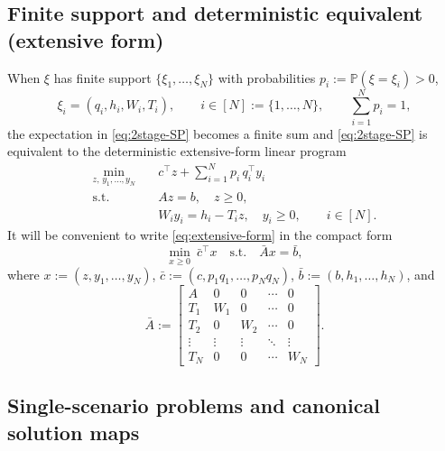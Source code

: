 \documentclass[11pt]{article}
\theoremstyle{plain}
\theoremstyle{definition}
\theoremstyle{remark}
\begin{document}
\subsection{Finite support and deterministic equivalent (extensive form)}\label{subsec:extensive}

When $\xi$ has finite support $\{\xi_1,\dots,\xi_N\}$ with probabilities $p_i:=\mathbb P(\xi=\xi_i)>0$,
\[
\xi_i=(q_i,h_i,W_i,T_i), \qquad i\in[N]:=\{1,\dots,N\}, \qquad \sum_{i=1}^N p_i=1,
\]
the expectation in \eqref{eq:2stage-SP} becomes a finite sum and \eqref{eq:2stage-SP} is equivalent to the
deterministic extensive-form linear program
\begin{equation}\label{eq:extensive-form}
\begin{aligned}
  \min_{z,\,y_1,\dots,y_N}\quad & c^\top z + \sum_{i=1}^N p_i\, q_i^\top y_i \\
  \text{s.t.}\quad & Az=b,\quad z\ge 0,\\
  & W_i y_i = h_i - T_i z,\quad y_i\ge 0,\qquad i\in[N].
\end{aligned}
\end{equation}
It will be convenient to write \eqref{eq:extensive-form} in the compact form
\begin{equation}\label{eq:extensive-compact}
  \min_{x\ge 0}\ \bar c^\top x \quad\text{s.t.}\quad \bar A x = \bar b,
\end{equation}
where $x:=(z,y_1,\dots,y_N)$, $\bar c:=(c,p_1q_1,\dots,p_N q_N)$, $\bar b:=(b,h_1,\dots,h_N)$, and
\begin{equation}\label{eq:Abar}
  \bar A :=
  \begin{bmatrix}
    A & 0 & 0 & \cdots & 0 \\
    T_1 & W_1 & 0 & \cdots & 0 \\
    T_2 & 0 & W_2 & \cdots & 0 \\
    \vdots & \vdots & \vdots & \ddots & \vdots \\
    T_N & 0 & 0 & \cdots & W_N
  \end{bmatrix}.
\end{equation}

\subsection{Single-scenario problems and canonical solution maps}\label{subsec:solution-maps}
\end{document}
